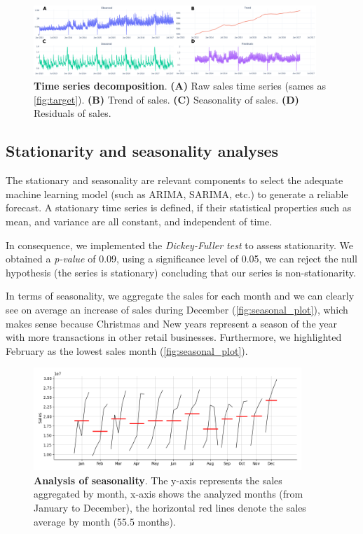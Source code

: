 \begin{figure}[!htb]
  \centering
  \includegraphics[width=0.95\textwidth]{plots/eda/timseries_decomposition.png}
  \caption[Time series decomposition]{\textbf{Time series decomposition}. \textbf{(A)} Raw sales time series (sames as \autoref{fig:target}). \textbf{(B)} Trend of sales. \textbf{(C)} Seasonality of sales. \textbf{(D)} Residuals of sales. }
  \label{fig:ts-decomposition}
\end{figure}

\subsection[Stationarity and seasonality analyses]{Stationarity and seasonality analyses}
\label{sec:st_s_analysis}


The stationary and seasonality are relevant components to select the adequate machine learning model (such as ARIMA, SARIMA, etc.) to generate a reliable forecast. A stationary time series is defined, if their statistical properties such as mean, and variance are all constant, and independent of time.

In consequence, we implemented the \textit{Dickey-Fuller test} to assess stationarity. We obtained a \textit{p-value} of 0.09, using a significance level of 0.05, we can reject the null hypothesis (the series is stationary) concluding that our series is non-stationarity.

In terms of seasonality, we aggregate the sales for each month and we can clearly see on average an increase of sales during December (\autoref{fig:seasonal_plot}), which makes sense because Christmas and New years represent a season of the year with more transactions in other retail businesses. Furthermore, we highlighted February as the lowest sales month (\autoref{fig:seasonal_plot}). 

\begin{figure}[!htb]
  \centering
  \includegraphics[width=0.9\textwidth]{plots/eda/seasonal_analysis.png}
  \caption[Analysis of seasonality]{\textbf{Analysis of seasonality}. The y-axis represents the sales aggregated by month, x-axis shows the analyzed months (from January to December), the horizontal red lines denote the sales average by month (55.5 months).}
  \label{fig:seasonal_plot}
\end{figure}

